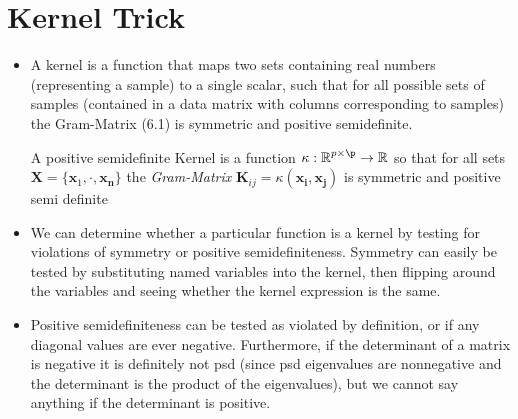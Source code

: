 \documentclass[english]{latex4ei/latex4ei_sheet}
\begin{document}
\section{Kernel Trick}
\begin{sectionbox}
\begin{itemize}
\item A kernel is a function that maps two sets containing real numbers (representing a sample) to a single scalar, such that for all possible sets of samples (contained in a data matrix with columns corresponding to samples) the Gram-Matrix (6.1) is symmetric and positive semidefinite.
\begin{emphbox}
    A positive semidefinite Kernel is a function $\kappa: \R^{p\times\p}\rightarrow\R$ so that for all sets $\mathbf{X}=\{\mathbf{x}_1,\cdot,\mathbf{x_n}\}$ the \emph{Gram-Matrix} $\mathbf{K}_{ij} = \kappa(\mathbf{x_i,x_j})$ is symmetric and positive semi definite  
\end{emphbox}
\item We can determine whether a particular function is a kernel by testing for violations of symmetry or positive semidefiniteness.
Symmetry can easily be tested by substituting named variables into the kernel, then flipping around the variables and seeing whether the kernel expression is the same.
\item Positive semidefiniteness can be tested as violated by definition, or if any diagonal values are ever negative. Furthermore, if the determinant of a matrix is negative it is definitely not psd (since psd eigenvalues are nonnegative and the determinant is the product of the eigenvalues), but we cannot say anything if the determinant is positive.
\end{itemize}
\end{sectionbox}
\end{document}
